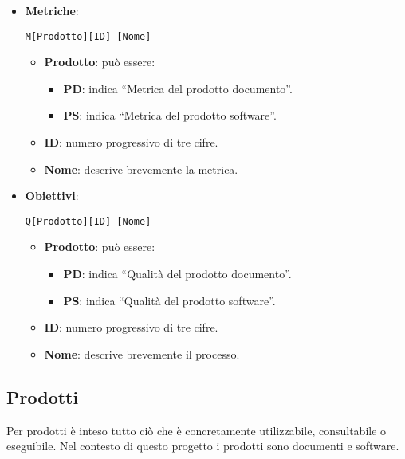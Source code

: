	\begin{itemize}

		\item \textbf{Metriche}:

		\begin{center}
			\texttt{M[Prodotto][ID] [Nome]}
		\end{center}

		\begin{itemize}
			\item \textbf{Prodotto}: può essere:
			\begin{itemize}
				\item \textbf{PD}: indica ``Metrica del prodotto documento''.
				\item \textbf{PS}: indica ``Metrica del prodotto software''.
			\end{itemize}
			\item \textbf{ID}: numero progressivo di tre cifre.
			\item \textbf{Nome}: descrive brevemente la metrica.
		\end{itemize}

		\item \textbf{Obiettivi}:

		\begin{center}
			\texttt{Q[Prodotto][ID] [Nome]}
		\end{center}

		\begin{itemize}
			\item \textbf{Prodotto}: può essere:
			\begin{itemize}
				\item \textbf{PD}: indica ``Qualità del prodotto documento''.
				\item \textbf{PS}: indica ``Qualità del prodotto software''.
			\end{itemize}
			\item \textbf{ID}: numero progressivo di tre cifre.
			\item \textbf{Nome}: descrive brevemente il processo.
		\end{itemize}


	\end{itemize}


\subsection{Prodotti}
Per prodotti è inteso tutto ciò che è concretamente utilizzabile, consultabile o eseguibile.
Nel contesto di questo progetto i prodotti sono documenti e software.

